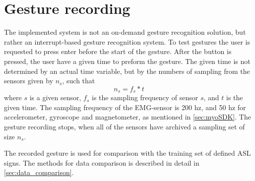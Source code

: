 \section{Gesture recording}
The implemented system is not an on-demand gesture recognition solution, but rather an interrupt-based gesture recognition system. To test gestures the user is requested to press enter before the start of the gesture. After the button is pressed, the user have a given time to preform the gesture. The given time is not determined by an actual time variable, but by the numbers of sampling from the sensors given by $n_{s}$, such that
\begin{equation}
\label{eq:data_size_eq}
    n_{s} = f_{s} * t
\end{equation}
where $s$ is a given sensor, $f_{s}$ is the sampling frequency of sensor $s$, and $t$ is the given time. The sampling frequency of the EMG-sensor is 200 hz, and 50 hz for accelerometer, gyroscope and magnetometer, as mentioned in \cref{sec:myoSDK}. The gesture recording stops, when all of the sensors have archived a sampling set of size $n_{s}$.

The recorded gesture is used for comparison with the training set of defined ASL signs. The methods for data comparison is described in detail in \cref{sec:data_comparison}.


